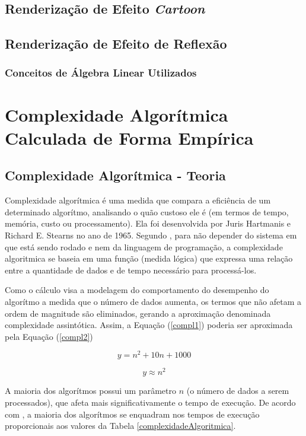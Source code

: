 {	\subsection{Renderização de Efeito \textit{Cartoon}}

	\subsection{Renderização de Efeito de Reflexão}
		\subsubsection{Conceitos de Álgebra Linear Utilizados}

\section{Complexidade Algorítmica Calculada de Forma Empírica}

	\subsection{Complexidade Algorítmica - Teoria}

	Complexidade algorítmica é uma medida que compara a eficiência de um determinado algorítmo, analisando o quão custoso ele é (em termos de tempo, memória, custo ou processamento). Ela foi desenvolvida por Juris Hartmanis e Richard E. Stearns no ano de 1965. Segundo \cite{complexidade}, para não depender do sistema em que está sendo rodado e nem da linguagem de programação, a complexidade algoritmica se baseia em uma função (medida lógica) que expressa uma relação entre a quantidade de dados e de tempo necessário para processá-los.

	 Como o cálculo visa a modelagem do comportamento do desempenho do algorítmo a medida que o número de dados aumenta, os termos que não afetam a ordem de magnitude são eliminados, gerando a aproximação denominada complexidade assintótica. Assim, a  Equação (\ref{compl1}) poderia ser aproximada pela  Equação (\ref{compl2})

	\begin{equation}
		y = n^{2} +10 n + 1000
	\label{compl1}
	\end{equation}

	\begin{equation}
		y \approx  n^{2} 
	\label{compl2}
	\end{equation}

	A maioria dos algorítmos possui um parâmetro $n$ (o número de dados a serem processados), que afeta mais significativamente o tempo de execução. De acordo com \cite{complexidade2}, a maioria dos algorítmos se enquadram nos tempos de execução proporcionais aos valores da Tabela \ref{complexidadeAlgoritmica}.

}
